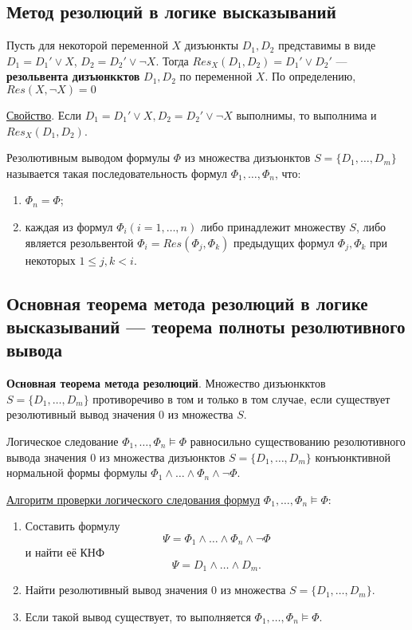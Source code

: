 \subsection{Метод резолюций в логике высказываний}
\dftion Пусть для некоторой переменной $X$ дизъюнкты $D_1, D_2$ представимы в виде $D_1 = D_1' \lor X$, $D_2 = D_2' \lor \lnot X$. Тогда $Res_X(D_1, D_2) = D_1' \lor D_2'$ --- \textbf{резольвента дизъюнкктов} $D_1, D_2$ по переменной $X$. По определению, $Res(X, \lnot X) = 0$

\underline{Свойство}. Если $D_1 = D_1' \lor X, D_2 = D_2' \lor \lnot X$ выполнимы, то выполнима и $Res_X(D_1, D_2)$.

\dftion Резолютивным выводом формулы $\Phi$ из множества дизъюнктов $S = \{D_1, \dots, D_m\}$ называется такая последовательность формул $\Phi_1, \dots, \Phi_n$, что:
\begin{enumerate}
    \item $\Phi_n = \Phi$;
    \item каждая из формул $\Phi_i (i = 1,\dots,n)$ либо принадлежит множеству $S$, либо является резольвентой $\Phi_i = Res(\Phi_j, \Phi_k)$ предыдущих формул $\Phi_j, \Phi_k$ при некоторых $1 \leq j, k < i$.
\end{enumerate}

\subsection{Основная теорема метода резолюций в логике высказываний --- теорема полноты резолютивного вывода}


\textbf{Основная теорема метода резолюций}. Множество дизъюнкктов $S=\{D_1,\dots,D_m\}$ противоречиво в том и только в том случае, если существует резолютивный вывод значения 0 из множества $S$.

Логическое следование $\Phi_1, \dots, \Phi_n \vDash \Phi$ равносильно существованию резолютивного вывода значения 0 из множества дизъюнктов $S = \{D_1, \dots, D_m\}$ конъюнктивной нормальной формы формулы $\Phi_1 \land \dots \land \Phi_n \land \lnot \Phi$.

\underline{Алгоритм проверки логического следования формул} $\Phi_1, \dots, \Phi_n \vDash \Phi$:
\begin{enumerate}
    \item Составить формулу $$\Psi = \Phi_1 \land \dots \land \Phi_n \land \lnot \Phi$$ и найти её КНФ $$\Psi = D_1 \land \dots \land D_m.$$
    \item Найти резолютивный вывод значения 0 из множества $S = \{D_1, \dots, D_m\}$.
    \item Если такой вывод существует, то выполняется $\Phi_1, \dots, \Phi_n \vDash \Phi$.
\end{enumerate}